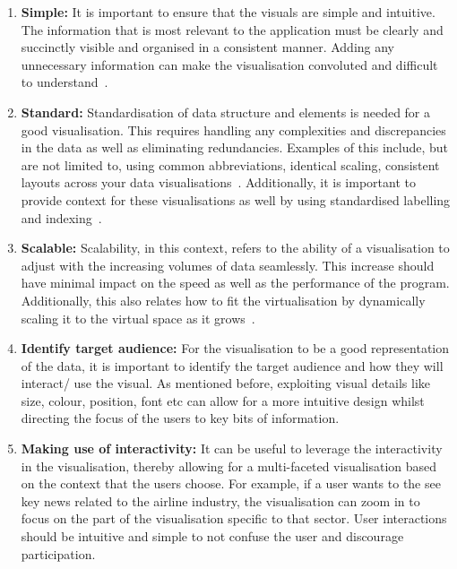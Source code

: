 \begin{enumerate}
\item \textbf{Simple:}
It is important to ensure that the visuals are simple and intuitive. The information that is most relevant to the application must be clearly and succinctly visible and organised in a consistent manner. Adding any unnecessary information can make the visualisation convoluted and difficult to understand~\cite{29_bhalla_2022}. 

\item \textbf{Standard:}
Standardisation of data structure and elements is needed for a good visualisation. This requires handling any complexities and discrepancies in the data as well as eliminating redundancies. Examples of this include, but are not limited to, using common abbreviations, identical scaling, consistent layouts across your data visualisations~\cite{29_bhalla_2022}. Additionally, it is important to provide context for these visualisations as well by using standardised labelling and indexing~\cite{30_vis}.

\item \textbf{Scalable:}
Scalability, in this context, refers to the ability of a visualisation to adjust with the increasing volumes of data seamlessly. This increase should have minimal impact on the speed as well as the performance of the program. Additionally, this also relates how to fit the virtualisation by dynamically scaling it to the virtual space as it grows~\cite{29_bhalla_2022}. 

\item \textbf{Identify target audience:}
 For the visualisation to be a good representation of the data, it is important to identify the target audience and how they will interact/ use the visual. As mentioned before, exploiting visual details like size, colour, position, font etc can allow for a more intuitive design whilst directing the focus of the users to key bits of information\cite{30_vis}. 

\item \textbf{Making use of interactivity:}
It can be useful to leverage the interactivity in the visualisation, thereby allowing for a multi-faceted visualisation based on the context that the users choose. For example, if a user wants to the see key news related to the airline industry, the visualisation can zoom in to focus on the part of the visualisation specific to that sector. User interactions should be intuitive and simple to not confuse the user and discourage participation. 

\end{enumerate}


